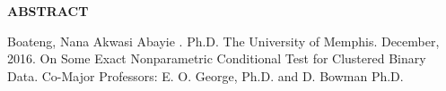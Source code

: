 \documentclass[12pt,oneside]{report}
\theoremstyle{definition}
\theoremstyle{mystyle}
\newcommand{\ind}{\hspace{4ex}}
\begin{document}
%
%	
%

\newpage
\singlespacing

\begin{center}\textbf{ABSTRACT}\end{center}

\ind Boateng, Nana Akwasi Abayie . Ph.D. The University of Memphis. December, 2016. On Some Exact Nonparametric Conditional Test for Clustered Binary Data. Co-Major Professors: E. O. George, Ph.D. and D. Bowman Ph.D.\\
\doublespacing
\end{document}
